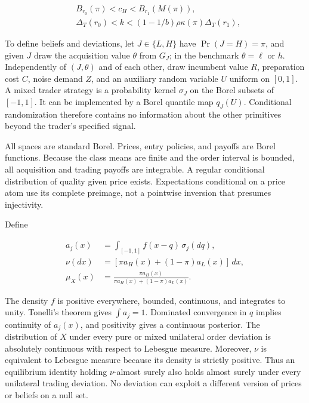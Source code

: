 \documentclass[
  11pt,
]{article}
\begin{document}
\[
\begin{aligned}
&B_{r_0}(\pi)<c_H<B_{r_1}(M(\pi)),\\
&\Delta_T(r_0)<k<(1-1/b)\rho\kappa(\pi)\Delta_T(r_1),
\end{aligned}
\tag{OA.1}\label{eq:oa-oa-1}
\]

To define beliefs and deviations, let \(J\in\{L,H\}\) have
\(\Pr(J=H)=\pi\), and given \(J\) draw the acquisition value \(\theta\)
from \(G_J\); in the benchmark \(\theta=\ell\) or \(h\). Independently of
\((J,\theta)\) and of each other, draw incumbent value \(R\), preparation
cost \(C\), noise demand \(Z\), and an auxiliary random variable \(U\)
uniform on \([0,1]\). A mixed trader strategy is a probability kernel
\(\sigma_J\) on the Borel subsets of \([-1,1]\). It can be implemented
by a Borel quantile map \(q_J(U)\). Conditional randomization therefore
contains no information about the other primitives beyond the trader's
specified signal.

All spaces are standard Borel. Prices, entry policies, and payoffs are
Borel functions. Because the class means are finite and the order
interval is bounded, all acquisition and trading payoffs are integrable. A regular conditional
distribution of quality given price exists. Expectations conditional on
a price atom use its complete preimage, not a pointwise inversion that
presumes injectivity.

Define

\[
\begin{aligned}
a_j(x)&=\int_{[-1,1]}f(x-q)\,\sigma_j(dq),\\
\nu(dx)&=[\pi a_H(x)+(1-\pi)a_L(x)]\,dx,\\
\mu_X(x)&=\frac{\pi a_H(x)}{\pi a_H(x)+(1-\pi)a_L(x)}.
\end{aligned}
\tag{OA.2}\label{eq:oa-oa-2}
\]

The density \(f\) is positive everywhere, bounded, continuous, and
integrates to unity. Tonelli's theorem gives \(\int a_j=1\).
Dominated convergence in \(q\) implies continuity of \(a_j(x)\),
and positivity gives a continuous posterior. The distribution of \(X\)
under every pure or mixed unilateral order deviation is absolutely
continuous with respect to Lebesgue measure. Moreover, \(\nu\) is
equivalent to Lebesgue measure because its density is strictly positive.
Thus an equilibrium identity holding \(\nu\)-almost surely also holds
almost surely under every unilateral trading deviation. No deviation can
exploit a different version of prices or beliefs on a null set.
\end{document}
